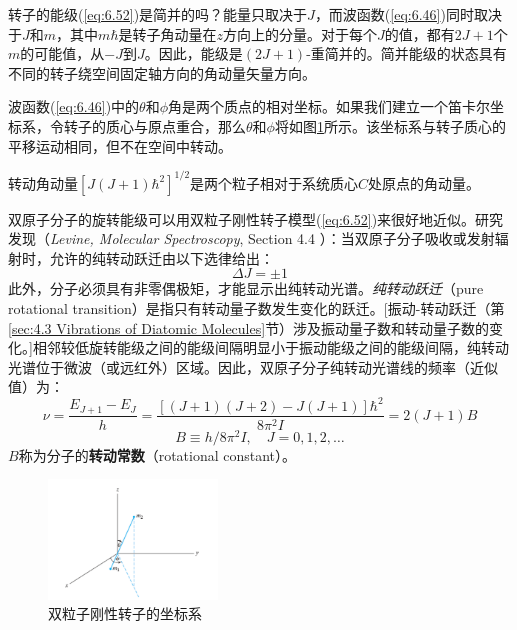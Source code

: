     转子的能级(\ref{eq:6.52})是简并的吗？能量只取决于$J$，而波函数(\ref{eq:6.46})同时取决于$J$和$m$，其中$m\hbar$是转子角动量在$z$方向上的分量。对于每个$J$的值，都有$2J+1$个$m$的可能值，从$-J$到$J$。因此，能级是$\left(2J+1\right)$-重简并的。简并能级的状态具有不同的转子绕空间固定轴方向的角动量矢量方向。

    波函数(\ref{eq:6.46})中的$\theta$和$\phi$角是两个质点的相对坐标。如果我们建立一个笛卡尔坐标系，令转子的质心与原点重合，那么$\theta$和$\phi$将如图\ref{fig:6.3}所示。该坐标系与转子质心的平移运动相同，但不在空间中转动。

    转动角动量$\left[J\left(J+1\right)\hbar^2\right]^{1/2}$是两个粒子相对于系统质心$C$处原点的角动量。

    双原子分子的旋转能级可以用双粒子刚性转子模型(\ref{eq:6.52})来很好地近似。研究发现（\textit{Levine, Molecular Spectroscopy}, Section 4.4 ）：当双原子分子吸收或发射辐射时，允许的纯转动跃迁由以下选律给出：
    \begin{equation}
        \Delta J = \pm 1
        \label{eq:6.53}
    \end{equation}
    此外，分子必须具有非零偶极矩，才能显示出纯转动光谱。\textit{纯转动跃迁}（pure rotational transition）是指只有转动量子数发生变化的跃迁。[振动-转动跃迁（第\ref{sec:4.3 Vibrations of Diatomic Molecules}节）涉及振动量子数和转动量子数的变化。]相邻较低旋转能级之间的能级间隔明显小于振动能级之间的能级间隔，纯转动光谱位于微波（或远红外）区域。因此，双原子分子纯转动光谱线的频率（近似值）为：
    \begin{equation}
        \nu = \frac{E_{J+1} - E_J}{h} = \frac{\left[\left(J+1\right)\left(J+2\right) - J\left(J+1\right)\right]\hbar^2}{8\pi^2 I} = 2\left(J+1\right)B
        \label{eq:6.54}
    \end{equation}
    \begin{equation}
        B \equiv h/8\pi^2 I, \quad J = 0, 1, 2, \ldots
        \label{eq:6.55}
    \end{equation}
    $B$称为分子的\textbf{转动常数}（rotational constant）。
    \begin{figure}[ht]
        \centering
        \includegraphics[width=0.4\textwidth]{Figures/6.3.png}
        \caption{双粒子刚性转子的坐标系}
        \label{fig:6.3}
    \end{figure}

